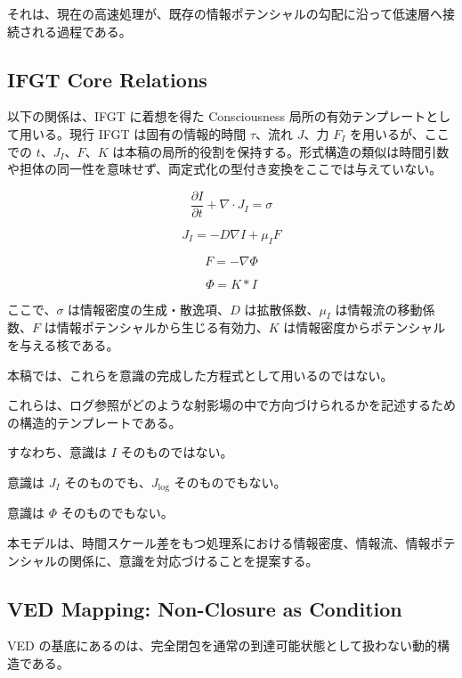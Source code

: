 それは、現在の高速処理が、既存の情報ポテンシャルの勾配に沿って低速層へ接続される過程である。

\subsection{IFGT Core Relations}

以下の関係は、IFGT に着想を得た Consciousness 局所の有効テンプレートとして用いる。現行 IFGT は固有の情報的時間 $\tau$、流れ $J$、力 $F_I$ を用いるが、ここでの $t$、$J_I$、$F$、$K$ は本稿の局所的役割を保持する。形式構造の類似は時間引数や担体の同一性を意味せず、両定式化の型付き変換をここでは与えていない。

\begin{equation}
\frac{\partial I}{\partial t} + \nabla \cdot J_I = \sigma
\end{equation}

\begin{equation}
J_I = -D \nabla I + \mu_I F
\end{equation}

\begin{equation}
F = -\nabla \Phi
\end{equation}

\begin{equation}
\Phi = K * I
\end{equation}

ここで、$\sigma$ は情報密度の生成・散逸項、$D$ は拡散係数、$\mu_I$ は情報流の移動係数、$F$ は情報ポテンシャルから生じる有効力、$K$ は情報密度からポテンシャルを与える核である。

本稿では、これらを意識の完成した方程式として用いるのではない。

これらは、ログ参照がどのような射影場の中で方向づけられるかを記述するための構造的テンプレートである。

すなわち、意識は $I$ そのものではない。

意識は $J_I$ そのものでも、$J_{\log}$ そのものでもない。

意識は $\Phi$ そのものでもない。

本モデルは、時間スケール差をもつ処理系における情報密度、情報流、情報ポテンシャルの関係に、意識を対応づけることを提案する。

\subsection{VED Mapping: Non-Closure as Condition}

VED の基底にあるのは、完全閉包を通常の到達可能状態として扱わない動的構造である。


